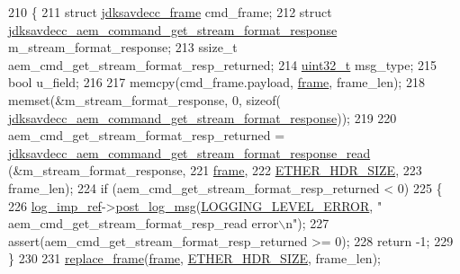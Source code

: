 \begin{DoxyCode}
210 \{
211     \textcolor{keyword}{struct }\hyperlink{structjdksavdecc__frame}{jdksavdecc\_frame} cmd\_frame;
212     \textcolor{keyword}{struct }\hyperlink{structjdksavdecc__aem__command__get__stream__format__response}{jdksavdecc\_aem\_command\_get\_stream\_format\_response}
       m\_stream\_format\_response;
213     ssize\_t aem\_cmd\_get\_stream\_format\_resp\_returned;
214     \hyperlink{parse_8c_a6eb1e68cc391dd753bc8ce896dbb8315}{uint32\_t} msg\_type;
215     \textcolor{keywordtype}{bool} u\_field;
216 
217     memcpy(cmd\_frame.payload, \hyperlink{gst__avb__playbin_8c_ac8e710e0b5e994c0545d75d69868c6f0}{frame}, frame\_len);
218     memset(&m\_stream\_format\_response, 0, \textcolor{keyword}{sizeof}(
      \hyperlink{structjdksavdecc__aem__command__get__stream__format__response}{jdksavdecc\_aem\_command\_get\_stream\_format\_response}));
219 
220     aem\_cmd\_get\_stream\_format\_resp\_returned = 
      \hyperlink{group__command__get__stream__format__response_ga5276f0e7a55c3e8acacbd787d2e1cef1}{jdksavdecc\_aem\_command\_get\_stream\_format\_response\_read}
      (&m\_stream\_format\_response,
221                                                                                                      
      \hyperlink{gst__avb__playbin_8c_ac8e710e0b5e994c0545d75d69868c6f0}{frame},
222                                                                                                      
      \hyperlink{namespaceavdecc__lib_a6c827b1a0d973e18119c5e3da518e65ca9512ad9b34302ba7048d88197e0a2dc0}{ETHER\_HDR\_SIZE},
223                                                                                                      
      frame\_len);
224     \textcolor{keywordflow}{if} (aem\_cmd\_get\_stream\_format\_resp\_returned < 0)
225     \{
226         \hyperlink{namespaceavdecc__lib_acbe3e2a96ae6524943ca532c87a28529}{log\_imp\_ref}->\hyperlink{classavdecc__lib_1_1log_a68139a6297697e4ccebf36ccfd02e44a}{post\_log\_msg}(\hyperlink{namespaceavdecc__lib_a501055c431e6872ef46f252ad13f85cdaf2c4481208273451a6f5c7bb9770ec8a}{LOGGING\_LEVEL\_ERROR}, \textcolor{stringliteral}{"
      aem\_cmd\_get\_stream\_format\_resp\_read error\(\backslash\)n"});
227         assert(aem\_cmd\_get\_stream\_format\_resp\_returned >= 0);
228         \textcolor{keywordflow}{return} -1;
229     \}
230 
231     \hyperlink{classavdecc__lib_1_1descriptor__base__imp_a482fe95208e9e14885e28e73e7be2c49}{replace\_frame}(\hyperlink{gst__avb__playbin_8c_ac8e710e0b5e994c0545d75d69868c6f0}{frame}, \hyperlink{namespaceavdecc__lib_a6c827b1a0d973e18119c5e3da518e65ca9512ad9b34302ba7048d88197e0a2dc0}{ETHER\_HDR\_SIZE}, frame\_len);

\end{DoxyCode}
